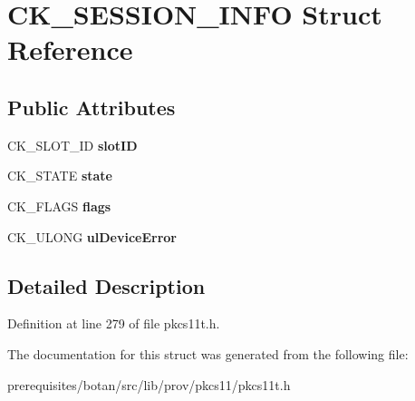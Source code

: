 \hypertarget{struct_c_k___s_e_s_s_i_o_n___i_n_f_o}{}\section{C\+K\+\_\+\+S\+E\+S\+S\+I\+O\+N\+\_\+\+I\+N\+FO Struct Reference}
\label{struct_c_k___s_e_s_s_i_o_n___i_n_f_o}
\subsection*{Public Attributes}
\begin{DoxyCompactItemize}
\item 
\mbox{\label{struct_c_k___s_e_s_s_i_o_n___i_n_f_o_a7d23320809045e8e249f7eaee3be95dc}} 
C\+K\+\_\+\+S\+L\+O\+T\+\_\+\+ID {\bfseries slot\+ID}
\item 
\mbox{\label{struct_c_k___s_e_s_s_i_o_n___i_n_f_o_af81b1726577cff3cb2ea3300d788e9f4}} 
C\+K\+\_\+\+S\+T\+A\+TE {\bfseries state}
\item 
\mbox{\label{struct_c_k___s_e_s_s_i_o_n___i_n_f_o_a58c14db50c63ab280fa00711755b10d9}} 
C\+K\+\_\+\+F\+L\+A\+GS {\bfseries flags}
\item 
\mbox{\label{struct_c_k___s_e_s_s_i_o_n___i_n_f_o_aced90615c518173a0e3fffc37c5e119f}} 
C\+K\+\_\+\+U\+L\+O\+NG {\bfseries ul\+Device\+Error}
\end{DoxyCompactItemize}


\subsection{Detailed Description}


Definition at line 279 of file pkcs11t.\+h.



The documentation for this struct was generated from the following file\+:\begin{DoxyCompactItemize}
\item 
prerequisites/botan/src/lib/prov/pkcs11/pkcs11t.\+h\end{DoxyCompactItemize}
